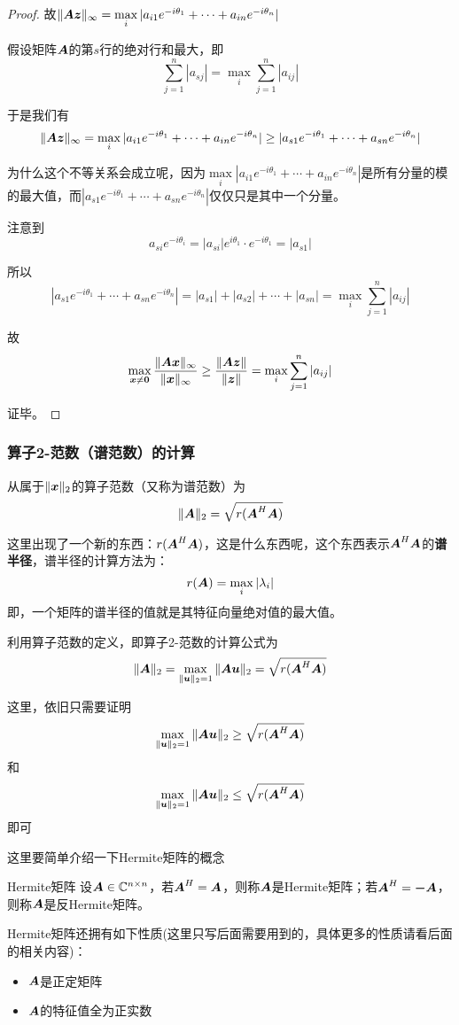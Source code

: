 \documentclass[12pt, a4paper, oneside, UTF8]{ctexbook}
\begin{document}
\begin{proof}
故$\Vert\boldsymbol{Az}\Vert_{\infty}=\max\limits_{i}|a_{i1}e^{-i\theta_1}+\cdots+a_{in}e^{-i\theta_n}|$

假设矩阵$\boldsymbol{A}$的第$s$行的绝对行和最大，即\[\sum_{j=1}^{n}|a_{sj}|=\max_i\sum_{j=1}^{n}|a_{ij}|\]

于是我们有
\[\Vert\boldsymbol{Az}\Vert_{\infty}=\max\limits_{i}|a_{i1}e^{-i\theta_1}+\cdots+a_{in}e^{-i\theta_n}|\geq|a_{s1}e^{-i\theta_1}+\cdots+a_{sn}e^{-i\theta_n}|\]

为什么这个不等关系会成立呢，因为$\max\limits_{i}|a_{i1}e^{-i\theta_1}+\cdots+a_{in}e^{-i\theta_n}|$是所有分量的模的最大值，而$|a_{s1}e^{-i\theta_1}+\cdots+a_{sn}e^{-i\theta_n}|$仅仅只是其中一个分量。

注意到\[a_{si}e^{-i\theta_i}=|a_{si}|e^{i\theta_1}\cdot e^{-i\theta_1}=|a_{s1}|\]

所以\[|a_{s1}e^{-i\theta_1}+\cdots+a_{sn}e^{-i\theta_n}|=|a_{s1}|+|a_{s2}|+\cdots+|a_{sn}|=\max_i\sum_{j=1}^{n}|a_{ij}|\]

故\[\max\limits_{\boldsymbol{x}\neq\boldsymbol{0}}\frac{\Vert\boldsymbol{Ax}\Vert_{\infty}}{\Vert\boldsymbol{x}\Vert_{\infty}}\geq\frac{\Vert\boldsymbol{Az}\Vert}{\Vert\boldsymbol{z}\Vert}=\max\limits_{i}\sum_{j=1}^{n}|a_{ij}|\]

证毕。
\end{proof}


\subsubsection{算子2-范数（谱范数）的计算}
从属于$\Vert\boldsymbol{x}\Vert_2$的算子范数（又称为谱范数）为\[\Vert\boldsymbol{A}\Vert_2=\sqrt{r(\boldsymbol{A}^H\boldsymbol{A})}\]

这里出现了一个新的东西：$r(\boldsymbol{A}^H\boldsymbol{A})$，这是什么东西呢，这个东西表示$\boldsymbol{A}^H\boldsymbol{A}$的\textbf{谱半径}，谱半径的计算方法为：
\[r(\boldsymbol{A})=\max\limits_i|\lambda_i|\]即，一个矩阵的谱半径的值就是其特征向量绝对值的最大值。

利用算子范数的定义，即算子2-范数的计算公式为\[\Vert\boldsymbol{A}\Vert_2=\max\limits_{\Vert\boldsymbol{u}\Vert_2=1}\Vert\boldsymbol{Au}\Vert_2=\sqrt{r(\boldsymbol{A}^H\boldsymbol{A})}\]

这里，依旧只需要证明\[\max\limits_{\Vert\boldsymbol{u}\Vert_2=1}\Vert\boldsymbol{Au}\Vert_2\geq\sqrt{r(\boldsymbol{A}^H\boldsymbol{A})}\]和\[\max\limits_{\Vert\boldsymbol{u}\Vert_2=1}\Vert\boldsymbol{Au}\Vert_2\leq\sqrt{r(\boldsymbol{A}^H\boldsymbol{A})}\]即可

这里要简单介绍一下Hermite矩阵的概念
\begin{defn}{Hermite矩阵}{}
    设$\boldsymbol{A}\in\mathbb{C}^{n\times n}$，若$\boldsymbol{A}^H=\boldsymbol{A}$，则称$\boldsymbol{A}$是Hermite矩阵；若$\boldsymbol{A}^H=\boldsymbol{-A}$，则称$\boldsymbol{A}$是反Hermite矩阵。
\end{defn}
Hermite矩阵还拥有如下性质(这里只写后面需要用到的，具体更多的性质请看后面的相关内容)：
\begin{itemize}
    \item $\boldsymbol{A}$是正定矩阵
    \item $\boldsymbol{A}$的特征值全为正实数
\end{itemize}
\end{document}
